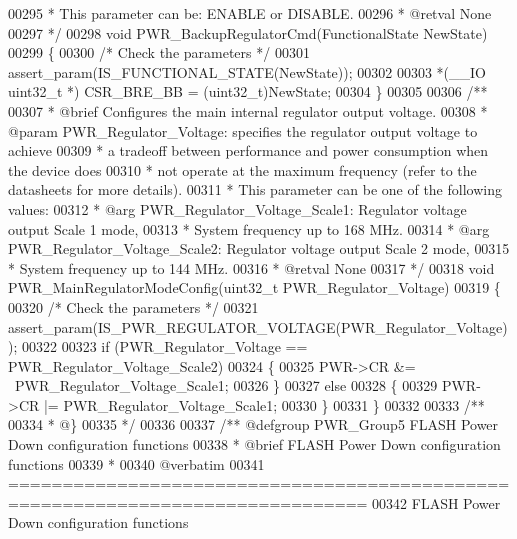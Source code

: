 \begin{DoxyCode}
00295 \textcolor{comment}{  *          This parameter can be: ENABLE or DISABLE.}
00296 \textcolor{comment}{  * @retval None}
00297 \textcolor{comment}{  */}
00298 \textcolor{keywordtype}{void} PWR_BackupRegulatorCmd(FunctionalState NewState)
00299 \{
00300   \textcolor{comment}{/* Check the parameters */}
00301   assert_param(IS\_FUNCTIONAL\_STATE(NewState));
00302 
00303   *(\_\_IO uint32\_t *) CSR_BRE_BB = (uint32\_t)NewState;
00304 \}
00305 
00306 \textcolor{comment}{/**}
00307 \textcolor{comment}{  * @brief  Configures the main internal regulator output voltage.}
00308 \textcolor{comment}{  * @param  PWR\_Regulator\_Voltage: specifies the regulator output voltage to achieve}
00309 \textcolor{comment}{  *         a tradeoff between performance and power consumption when the device does}
00310 \textcolor{comment}{  *         not operate at the maximum frequency (refer to the datasheets for more details).}
00311 \textcolor{comment}{  *          This parameter can be one of the following values:}
00312 \textcolor{comment}{  *            @arg PWR\_Regulator\_Voltage\_Scale1: Regulator voltage output Scale 1 mode, }
00313 \textcolor{comment}{  *                                                System frequency up to 168 MHz. }
00314 \textcolor{comment}{  *            @arg PWR\_Regulator\_Voltage\_Scale2: Regulator voltage output Scale 2 mode, }
00315 \textcolor{comment}{  *                                                System frequency up to 144 MHz.    }
00316 \textcolor{comment}{  * @retval None}
00317 \textcolor{comment}{  */}
00318 \textcolor{keywordtype}{void} PWR_MainRegulatorModeConfig(uint32\_t PWR\_Regulator\_Voltage)
00319 \{
00320   \textcolor{comment}{/* Check the parameters */}
00321   assert_param(IS\_PWR\_REGULATOR\_VOLTAGE(PWR\_Regulator\_Voltage));
00322 
00323   \textcolor{keywordflow}{if} (PWR\_Regulator\_Voltage == PWR_Regulator_Voltage_Scale2)
00324   \{
00325     PWR->CR &= ~PWR_Regulator_Voltage_Scale1;
00326   \}
00327   \textcolor{keywordflow}{else}
00328   \{
00329     PWR->CR |= PWR_Regulator_Voltage_Scale1;
00330   \}
00331 \}
00332 
00333 \textcolor{comment}{/**}
00334 \textcolor{comment}{  * @\}}
00335 \textcolor{comment}{  */}
00336 
00337 \textcolor{comment}{/** @defgroup PWR\_Group5 FLASH Power Down configuration functions}
00338 \textcolor{comment}{ *  @brief   FLASH Power Down configuration functions }
00339 \textcolor{comment}{ *}
00340 \textcolor{comment}{@verbatim   }
00341 \textcolor{comment}{ ===============================================================================}
00342 \textcolor{comment}{           FLASH Power Down configuration functions}

\end{DoxyCode}
